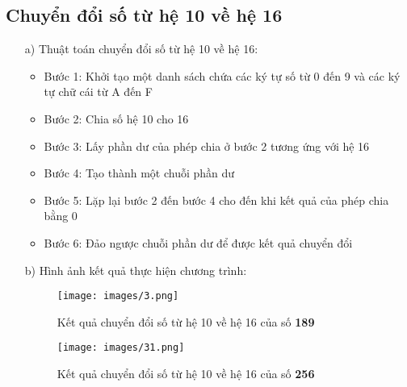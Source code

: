 \documentclass[20pt]{article}
\begin{document}
\subsection{Chuyển đổi số từ hệ 10 về hệ 16}
\begin{enumerate}
    \item[a)] Thuật toán chuyển đổi số từ hệ 10 về hệ 16:
    \begin{itemize}
        \item Bước 1: Khởi tạo một danh sách chứa các ký tự số từ 0 đến 9 và các ký tự chữ cái từ A đến F
        \item Bước 2: Chia số hệ 10 cho 16
        \item Bước 3: Lấy phần dư của phép chia ở bước 2 tương ứng với hệ 16
        \item Bước 4: Tạo thành một chuỗi phần dư
        \item Bước 5: Lặp lại bước 2 đến bước 4 cho đến khi kết quả của phép chia bằng 0
        \item Bước 6: Đảo ngược chuỗi phần dư để được kết quả chuyển đổi
    \end{itemize}
    \item[b)] Hình ảnh kết quả thực hiện chương trình:
    \begin{figure}[H]
        \centering
        \texttt{[image: images/3.png]}
        \caption{Kết quả chuyển đổi số từ hệ 10 về hệ 16 của số \textbf{189}}
        \label{fig:my_label}
    \end{figure}
    \begin{figure}[H]
        \centering
        \texttt{[image: images/31.png]}
        \caption{Kết quả chuyển đổi số từ hệ 10 về hệ 16 của số \textbf{256}}
        \label{fig:my_label}
    \end{figure}
\end{enumerate}

\end{document}
